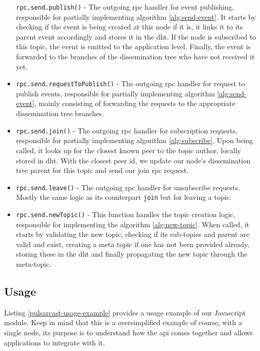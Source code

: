 \begin{itemize}
    \verb|rpc.send.publish()| - The outgoing \acrshort{rpc} handler for event publishing, responsible for partially implementing algorithm \ref{alg:send-event}. It starts by checking if the event is being created at this node if it is, it links it to its parent event accordingly and stores it in the \acrshort{dht}. If the node is subscribed to this topic, the event is emitted to the application level. Finally, the event is forwarded to the branches of the dissemination tree who have not received it yet.
  \item
    \verb|rpc.send.requestToPublish()| - The outgoing \acrshort{rpc} handler for request to publish events, responsible for partially implementing algorithm \ref{alg:send-event}, mainly consisting of forwarding the requests to the appropriate dissemination tree branches.
  \item
    \verb|rpc.send.join()| - The outgoing \acrshort{rpc} handler for subscription requests, responsible for partially implementing algorithm \ref{alg:subscribe}. Upon being called, it looks up for the closest known peer to the topic author, locally stored in \acrshort{dht}. With the closest peer id, we update our node's dissemination tree parent for this topic and send our join \acrshort{rpc} request.
  \item
    \verb|rpc.send.leave()| - The outgoing \acrshort{rpc} handler for unsubscribe requests. Mostly the same logic as its counterpart \verb|join| but for leaving a topic.
  \item
    \verb|rpc.send.newTopic()| - This function handles the topic creation logic, responsible for implementing the algorithm \ref{alg:new-topic}.  When called, it starts by validating the new topic, checking if its sub-topics and parent are valid and exist, creating a meta topic if one has not been provided already, storing these in the \acrshort{dht} and finally propagating the new topic through the meta-topic.
\end{itemize}

\subsection{Usage}\label{subsec:usage}

Listing \ref{pulsarcast-usage-example} provides a usage example of our
Javascript module. Keep in mind that this is a oversimplified example of
course, with a single node, its purpose is to understand how the \acrshort{api} comes
together and allows applications to integrate with it.

